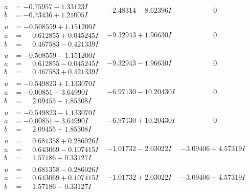 \documentclass[1p]{elsarticle_modified}
\theoremstyle{definition}
\begin{document}
$$\begin{array}{c|c|c}
\begin{aligned}
a &= -0.75957 - 1.33123 I \\
b &= -0.73436 + 1.21005 I\end{aligned}
 & -2.48314 - 8.62396 I & \phantom{-0.000000 } 0 \\ \hline\begin{aligned}
u &= -0.508559 + 1.151200 I \\
a &= \phantom{-}0.612855 + 0.045245 I \\
b &= \phantom{-}0.467583 - 0.421339 I\end{aligned}
 & -9.32943 + 1.96630 I & \phantom{-0.000000 } 0 \\ \hline\begin{aligned}
u &= -0.508559 - 1.151200 I \\
a &= \phantom{-}0.612855 - 0.045245 I \\
b &= \phantom{-}0.467583 + 0.421339 I\end{aligned}
 & -9.32943 - 1.96630 I & \phantom{-0.000000 } 0 \\ \hline\begin{aligned}
u &= -0.549823 + 1.133070 I \\
a &= -0.00851 + 3.64990 I \\
b &= \phantom{-}2.09455 - 1.85308 I\end{aligned}
 & -6.97130 - 10.20430 I & \phantom{-0.000000 } 0 \\ \hline\begin{aligned}
u &= -0.549823 - 1.133070 I \\
a &= -0.00851 - 3.64990 I \\
b &= \phantom{-}2.09455 + 1.85308 I\end{aligned}
 & -6.97130 + 10.20430 I & \phantom{-0.000000 } 0 \\ \hline\begin{aligned}
u &= \phantom{-}0.681358 + 0.286026 I \\
a &= \phantom{-}0.643069 - 0.107415 I \\
b &= \phantom{-}1.57186 + 0.33127 I\end{aligned}
 & -1.01732 - 2.03022 I & -3.09406 + 4.57319 I \\ \hline\begin{aligned}
u &= \phantom{-}0.681358 - 0.286026 I \\
a &= \phantom{-}0.643069 + 0.107415 I \\
b &= \phantom{-}1.57186 - 0.33127 I\end{aligned}
 & -1.01732 + 2.03022 I & -3.09406 - 4.57319 I \\ \hline\begin{aligned}

\end{aligned}
\end{array}$$
\end{document}
